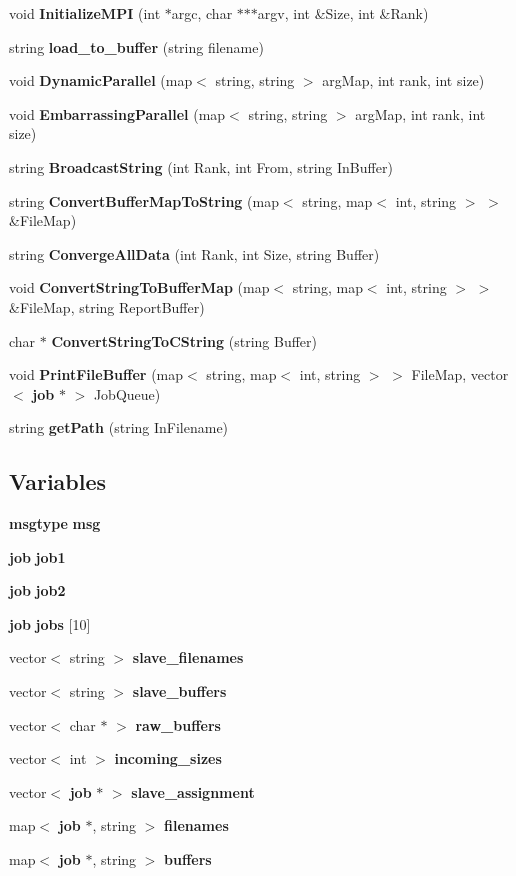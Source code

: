 \begin{CompactItemize}
\item 
void {\bf InitializeMPI} (int $\ast$argc, char $\ast$$\ast$$\ast$argv, int \&Size, int \&Rank)
\item 
string {\bf load\_\-to\_\-buffer} (string filename)
\item 
void {\bf DynamicParallel} (map$<$ string, string $>$ argMap, int rank, int size)
\item 
void {\bf EmbarrassingParallel} (map$<$ string, string $>$ argMap, int rank, int size)
\item 
string {\bf BroadcastString} (int Rank, int From, string InBuffer)
\item 
string {\bf ConvertBufferMapToString} (map$<$ string, map$<$ int, string $>$ $>$ \&FileMap)
\item 
string {\bf ConvergeAllData} (int Rank, int Size, string Buffer)
\item 
void {\bf ConvertStringToBufferMap} (map$<$ string, map$<$ int, string $>$ $>$ \&FileMap, string ReportBuffer)
\item 
char $\ast$ {\bf ConvertStringToCString} (string Buffer)
\item 
void {\bf PrintFileBuffer} (map$<$ string, map$<$ int, string $>$ $>$ FileMap, vector$<$ {\bf job} $\ast$ $>$ JobQueue)
\item 
string {\bf getPath} (string InFilename)
\end{CompactItemize}
\subsection*{Variables}
\begin{CompactItemize}
\item 
{\bf msgtype} {\bf msg}
\item 
{\bf job} {\bf job1}
\item 
{\bf job} {\bf job2}
\item 
{\bf job} {\bf jobs} [10]
\item 
vector$<$ string $>$ {\bf slave\_\-filenames}
\item 
vector$<$ string $>$ {\bf slave\_\-buffers}
\item 
vector$<$ char $\ast$ $>$ {\bf raw\_\-buffers}
\item 
vector$<$ int $>$ {\bf incoming\_\-sizes}
\item 
vector$<$ {\bf job} $\ast$ $>$ {\bf slave\_\-assignment}
\item 
map$<$ {\bf job} $\ast$, string $>$ {\bf filenames}
\item 
map$<$ {\bf job} $\ast$, string $>$ {\bf buffers}
\end{CompactItemize}


